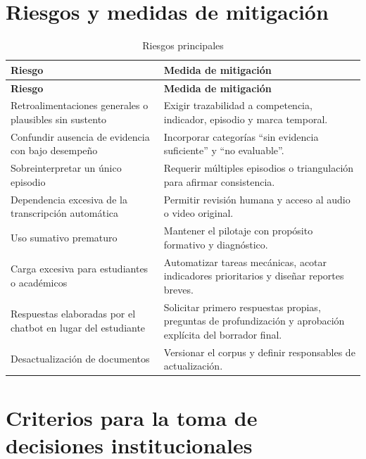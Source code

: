 \documentclass[11pt,a4paper]{article}
\begin{document}
\section{Riesgos y medidas de mitigación}

\begin{longtable}{p{5.0cm}p{10.0cm}}
\caption{Riesgos principales}\\
\toprule
\textbf{Riesgo} & \textbf{Medida de mitigación}\\
\midrule
\endfirsthead
\toprule
\textbf{Riesgo} & \textbf{Medida de mitigación}\\
\midrule
\endhead

Retroalimentaciones generales o plausibles sin sustento &
Exigir trazabilidad a competencia, indicador, episodio y marca temporal.\\
\midrule

Confundir ausencia de evidencia con bajo desempeño &
Incorporar categorías ``sin evidencia suficiente'' y ``no evaluable''.\\
\midrule

Sobreinterpretar un único episodio &
Requerir múltiples episodios o triangulación para afirmar consistencia.\\
\midrule

Dependencia excesiva de la transcripción automática &
Permitir revisión humana y acceso al audio o video original.\\
\midrule

Uso sumativo prematuro &
Mantener el pilotaje con propósito formativo y diagnóstico.\\
\midrule

Carga excesiva para estudiantes o académicos &
Automatizar tareas mecánicas, acotar indicadores prioritarios y diseñar reportes breves.\\
\midrule

Respuestas elaboradas por el chatbot en lugar del estudiante &
Solicitar primero respuestas propias, preguntas de profundización y aprobación explícita del borrador final.\\
\midrule

Desactualización de documentos &
Versionar el corpus y definir responsables de actualización.\\
\bottomrule
\end{longtable}

\section{Criterios para la toma de decisiones institucionales}
\end{document}
